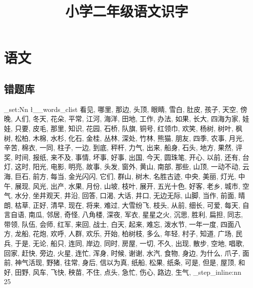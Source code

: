 \documentclass[scheme=chinese]{ctexart}
\title{小学二年级语文识字}
\begin{document}
\maketitle
\section{语文}
\subsection{错题库}
\setlength{\parindent}{0pt}

\ExplSyntaxOn
\clist_set:Nn \l__words_clist
{
{看见},
{哪里},
{那边},
{头顶},
{眼睛},
{雪白},
{肚皮},
{孩子},
{天空},
{傍晚},
{人们},
{冬天},
{花朵},
{平常},
{江河},
{海洋},
{田地},
{工作},
{办法},
{如果},
{长大},
{四海为家},
{娃娃},
{只要},
{皮毛},
{那里},
{知识},
{花园},
{石桥},
{队旗},
{铜号},
{红领巾},
{欢笑},
{杨树},
{树叶},
{枫树},
{松柏},
{木棉},
{水杉},
{化石},
{金桂},
{丛林},
{深处},
{竹林},
{熊猫},
{朋友},
{四季},
{农事},
{月光},
{辛苦},
{棉衣},
{一同},
{柱子},
{一边},
{到底},
{秤杆},
{力气},
{出来},
{船身},
{石头},
{地方},
{果然},
{评奖},
{时间},
{报纸},
{来不及},
{事情},
{坏事},
{好事},
{出国},
{今天},
{圆珠笔},
{开心},
{以前},
{还有},
{台灯},
{这时},
{阳光},
{电影},
{明亮},
{故事},
{头发},
{窗外},
{黄山},
{南部},
{那些},
{山顶},
{一动不动},
{云海},
{巨石},
{前方},
{每当},
{金光闪闪},
{它们},
{群山},
{树木},
{名胜古迹},
{中央},
{美丽},
{灯光},
{中午},
{展现},
{风光},
{出产},
{水果},
{月份},
{山坡},
{枝叶},
{展开},
{五光十色},
{好客},
{老乡},
{城市},
{空气},
{水分},
{坐井观天},
{井沿},
{回答},
{口渴},
{大话},
{井口},
{无边无际},
{山脚},
{当作},
{前面},
{晴朗},
{枯草},
{正好},
{清早},
{现在},
{将来},
{难过},
{大雪纷飞},
{枝头},
{从前},
{细长},
{可爱},
{每天},
{自言自语},
{南瓜},
{邻居},
{奇怪},
{八角楼},
{深夜},
{军衣},
{星星之火},
{沉思},
{胜利},
{扁担},
{同志},
{带领},
{队伍},
{会师},
{红军},
{来回},
{战士},
{白天},
{起来},
{难忘},
{泼水节},
{一年一度},
{四面八方},
{龙船},
{花炮},
{欢呼},
{人群},
{欢乐},
{开始},
{柏树枝},
{多么},
{年轻},
{村子},
{知道},
{广场},
{民兵},
{于是},
{无论},
{船只},
{连同},
{岸边},
{同时},
{房屋},
{一切},
{不久},
{出现},
{散步},
{空地},
{唱歌},
{回家},
{赶快},
{旁边},
{火星},
{连忙},
{浑身},
{时候},
{谢谢},
{水汽},
{食物},
{身边},
{为什么},
{爪子},
{面前},
{神气活现},
{野猪},
{往常},
{身后},
{信以为真},
{纸船},
{松果},
{纸条},
{可是},
{但是},
{屋顶},
{和好},
{田野},
{风车},
{飞快},
{秧苗},
{不住},
{点头},
{急忙},
{伤心},
{路边},
{生气},
}
\int_step_inline:nn {25}
{
\hspace{1cm}
}
\ExplSyntaxOff
\end{document}
